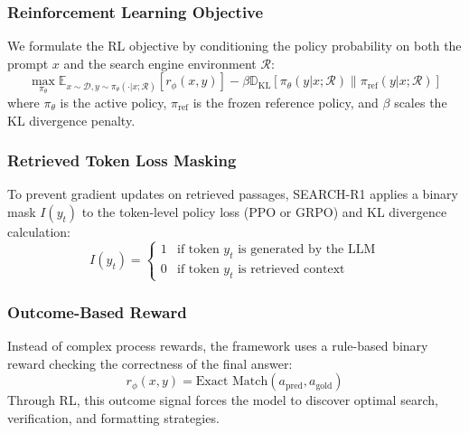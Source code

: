 \documentclass[11pt,a4paper]{article}
\begin{document}
\subsubsection{Reinforcement Learning Objective}
We formulate the RL objective by conditioning the policy probability on both the prompt $x$ and the search engine environment $\mathcal{R}$:
\begin{equation}
\max_{\pi_\theta} \mathbb{E}_{x \sim \mathcal{D}, y \sim \pi_\theta(\cdot|x; \mathcal{R})} \left[ r_\phi(x, y) \right] - \beta \mathbb{D}_{\text{KL}} \left[ \pi_\theta(y | x; \mathcal{R}) \parallel \pi_{\text{ref}}(y | x; \mathcal{R}) \right]
\end{equation}
where $\pi_\theta$ is the active policy, $\pi_{\text{ref}}$ is the frozen reference policy, and $\beta$ scales the KL divergence penalty.

\subsubsection{Retrieved Token Loss Masking}
To prevent gradient updates on retrieved passages, SEARCH-R1 applies a binary mask $I(y_t)$ to the token-level policy loss (PPO or GRPO) and KL divergence calculation:
\begin{equation}
I(y_t) = \begin{cases} 1 & \text{if token } y_t \text{ is generated by the LLM} \\ 0 & \text{if token } y_t \text{ is retrieved context} \end{cases}
\end{equation}

\subsubsection{Outcome-Based Reward}
Instead of complex process rewards, the framework uses a rule-based binary reward checking the correctness of the final answer:
\begin{equation}
r_\phi(x, y) = \text{Exact Match}(a_{\text{pred}}, a_{\text{gold}})
\end{equation}
Through RL, this outcome signal forces the model to discover optimal search, verification, and formatting strategies.
\end{document}

